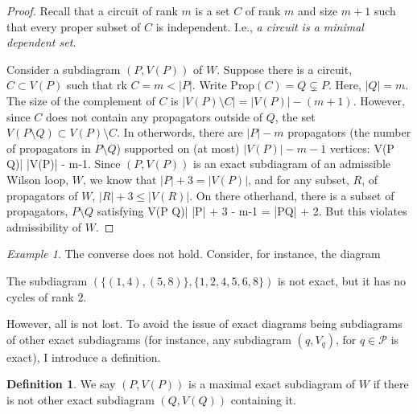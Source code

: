 \documentclass[11pt]{article}
\newcommand{\drawWLD}[2]{

\pgfmathsetmacro{\n}{#1}
\pgfmathsetmacro{\radius}{#2}
\pgfmathsetmacro{\angle}{360/\n}
    \foreach \i in {1,2,...,\n} {
      \pgfmathsetmacro{\x}{\angle*\i}
        \draw[-,shorten >=-\radius*0.1 cm,shorten <=-\radius*0.1 cm]  (\x:\radius cm)-- (\x + \angle: \radius cm);
    }

\draw (\angle:\radius) node {$\bullet$};
}
\newcommand{\drawprop}[4]{
\pgfmathsetmacro{\r}{#1}
\pgfmathsetmacro{\bumpr}{#2}
\pgfmathsetmacro{\s}{#3}
\pgfmathsetmacro{\bumps}{#4}
\pgfmathsetmacro{\perturbe}{\angle/\n}

\begin{scope}
\clip (\angle*\r:\radius) -- (\angle + \angle*\r:\radius) -- (\angle*\s:\radius) -- (\angle + \angle*\s:\radius) -- (\angle*\r:\radius);
\draw[propagator] (\angle*\r + \angle/2 + \bumpr*\perturbe:\radius) -- (\angle*\s + \angle/2 + \bumps*\perturbe:\radius);
\end{scope}
}
\newcommand{\rk}{\textrm{rk }}
\def\bas #1\eas{\begin{align*} #1 \end{align*}}
\newcommand{\cP}{\mathcal{P}}
\newcommand{\Prop}{\textrm{Prop}}
\theoremstyle{remark}
\newtheorem{eg}[thm]{Example}
\theoremstyle{definition}
\newtheorem{dfn}[thm]{Definition}
\begin{document}
\begin{proof}
Recall that a circuit of rank $m$ is a set $C$ of rank $m$ and size $m+1$ such that every proper subset of $C$ is independent. I.e., \emph{a circuit is a minimal dependent set.}

Consider a subdiagram $(P, V(P))$ of $W$. Suppose there is a circuit, $C \subset V(P)$ such that $\rk C = m < |P|$. Write $\Prop (C) = Q \subsetneq P$. Here, $|Q| = m$. The size of the complement of $C$ is $|V(P) \setminus C| = |V(P)| -(m+1)$. However, since $C$ does not contain any propagators outside of $Q$, the set $V(P \setminus Q) \subset V(P )\setminus C$. In otherwords, there are $|P| - m$ propagators (the number of propagators in $P \setminus Q$) supported on (at most) $|V(P)|-m -1$ vertices: \bas |V(P \setminus Q)| \leq |V(P)| - m-1\;. \eas Since $(P, V(P))$ is an exact subdiagram of an admissible Wilson loop, $W$, we know that $|P| + 3 = |V(P)|$, and for any subset, $R$, of propagators of $W$, $|R|+3 \leq |V(R)|$. On there otherhand, there is a subset of propagators, $P\setminus Q$ satisfying \bas |V(P \setminus Q)| \leq |P| + 3 - m-1 = |P\setminus Q| + 2\;. \eas But this violates admissibility of $W$.
\end{proof}


\begin{eg}
The converse does not hold. Consider, for instance, the diagram



The subdiagram $( \{(1, 4), (5, 8)\}, \{1, 2, 4, 5, 6, 8\})$ is not exact, but it has no cycles of rank $2$.
\end{eg}

However, all is not lost. To avoid the issue of exact diagrams being subdiagrams of other exact subdiagrams (for instance, any subdiagram $(q, V_q)$, for $q \in \cP$ is exact), I introduce a definition.

\begin{dfn}
We say $(P, V(P))$ is a maximal exact subdiagram of $W$ if there is not other exact subdiagram $(Q, V(Q))$ containing it.
\end{dfn}
\end{document}
